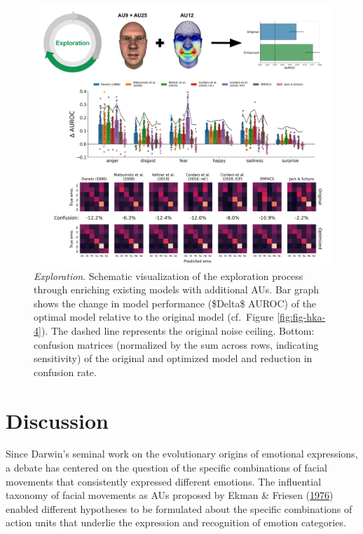 \documentclass[11pt,american,a4paper,oneside,]{memoir} %
\begin{document}
\begin{figure}
\centering
\includegraphics{_bookdown_files/hypothesis-kernel-analysis-files/figures/figure_6.pdf}
\caption{\label{fig:fig-hka-6}\emph{Exploration}. Schematic visualization of the exploration process through enriching existing models with additional AUs. Bar graph shows the change in model performance (\$Delta\$ AUROC) of the optimal model relative to the original model (cf.~Figure \ref{fig:fig-hka-4}). The dashed line represents the original noise ceiling. Bottom: confusion matrices (normalized by the sum across rows, indicating sensitivity) of the original and optimized model and reduction in confusion rate.}
\end{figure}



\hypertarget{hka-discussion}{%
\section{Discussion}\label{hka-discussion}}

Since Darwin's seminal work on the evolutionary origins of emotional expressions, a debate has centered on the question of the specific combinations of facial movements that consistently expressed different emotions. The influential taxonomy of facial movements as AUs proposed by Ekman \& Friesen (\protect\hyperlink{ref-Ekman1976-hm}{1976}) enabled different hypotheses to be formulated about the specific combinations of action units that underlie the expression and recognition of emotion categories.
\end{document}
